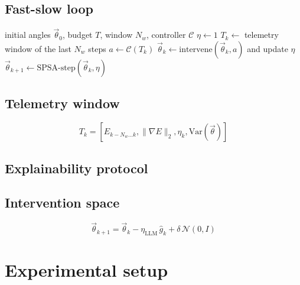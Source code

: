 \documentclass[11pt,a4paper]{article}
\begin{document}
\subsection{Fast-slow loop}

\begin{algorithm}
\caption{SPSA with a slow-loop controller}\label{alg:fastslow}
\begin{algorithmic}[1]
\Require initial angles $\vec{\theta}_0$, budget $T$, window $N_w$, controller $\mathcal{C}$
\State $\eta \gets 1$
    \State $T_k \gets$ telemetry window of the last $N_w$ steps
    \State $a \gets \mathcal{C}(T_k)$
    \State $\vec{\theta}_k \gets \mathrm{intervene}(\vec{\theta}_k, a)$ and update $\eta$
  \EndIf
  \State $\vec{\theta}_{k+1} \gets \mathrm{SPSA\text{-}step}(\vec{\theta}_k, \eta)$
\EndFor
\end{algorithmic}
\end{algorithm}
\subsection{Telemetry window}
\begin{equation}
T_k = \left[E_{k-N_w \ldots k}, \lVert \nabla E \rVert_2, \eta_k, \mathrm{Var}(\vec{\theta})\right]
\end{equation}
\subsection{Explainability protocol}
\subsection{Intervention space}
\begin{equation}
\vec{\theta}_{k+1} = \vec{\theta}_k - \eta_{\mathrm{LLM}} \, \hat{g}_k + \delta \, \mathcal{N}(0, I)
\end{equation}

\section{Experimental setup}
% 
\end{document}
